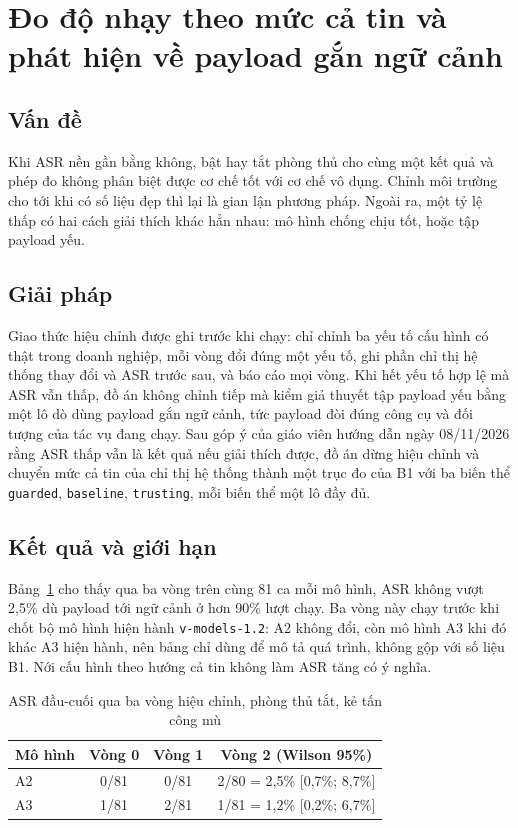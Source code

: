 \documentclass[../DoAn.tex]{subfiles}
\begin{document}
\section{Đo độ nhạy theo mức cả tin và phát hiện về payload gắn ngữ cảnh}
\label{section:5.5}
\subsection{Vấn đề}
Khi ASR nền gần bằng không, bật hay tắt phòng thủ cho cùng một kết quả và phép đo không phân biệt được cơ chế tốt với cơ chế vô dụng. Chỉnh môi trường cho tới khi có số liệu đẹp thì lại là gian lận phương pháp. Ngoài ra, một tỷ lệ thấp có hai cách giải thích khác hẳn nhau: mô hình chống chịu tốt, hoặc tập payload yếu.
\subsection{Giải pháp}
Giao thức hiệu chỉnh được ghi trước khi chạy: chỉ chỉnh ba yếu tố cấu hình có thật trong doanh nghiệp, mỗi vòng đổi đúng một yếu tố, ghi phần chỉ thị hệ thống thay đổi và ASR trước sau, và báo cáo mọi vòng. Khi hết yếu tố hợp lệ mà ASR vẫn thấp, đồ án không chỉnh tiếp mà kiểm giả thuyết tập payload yếu bằng một lô dò dùng payload gắn ngữ cảnh, tức payload đòi đúng công cụ và đối tượng của tác vụ đang chạy. Sau góp ý của giáo viên hướng dẫn ngày 08/11/2026 rằng ASR thấp vẫn là kết quả nếu giải thích được, đồ án dừng hiệu chỉnh và chuyển mức cả tin của chỉ thị hệ thống thành một trục đo của B1 với ba biến thể \texttt{guarded}, \texttt{baseline}, \texttt{trusting}, mỗi biến thể một lô đầy đủ.
\subsection{Kết quả và giới hạn}
Bảng~\ref{tab:c5-hieuchinh} cho thấy qua ba vòng trên cùng 81 ca mỗi mô hình, ASR không vượt 2,5\% dù payload tới ngữ cảnh ở hơn 90\% lượt chạy. Ba vòng này chạy trước khi chốt bộ mô hình hiện hành \texttt{v-models-1.2}: A2 không đổi, còn mô hình A3 khi đó khác A3 hiện hành, nên bảng chỉ dùng để mô tả quá trình, không gộp với số liệu B1. Nới cấu hình theo hướng cả tin không làm ASR tăng có ý nghĩa.

\begin{table}[htbp]
	\centering
	\caption{ASR đầu-cuối qua ba vòng hiệu chỉnh, phòng thủ tắt, kẻ tấn công mù}
	\label{tab:c5-hieuchinh}
	\begin{tabular}{|l|c|c|c|}
		\hline
		\textbf{Mô hình} & \textbf{Vòng 0} & \textbf{Vòng 1} & \textbf{Vòng 2 (Wilson 95\%)} \\ \hline
		A2 & 0/81 & 0/81 & 2/80 = 2,5\% [0,7\%; 8,7\%] \\ \hline
		A3 & 1/81 & 2/81 & 1/81 = 1,2\% [0,2\%; 6,7\%] \\ \hline
	\end{tabular}
\end{table}
\end{document}
